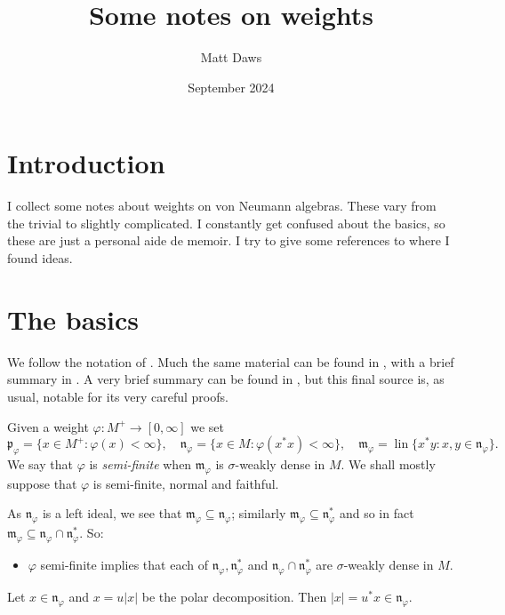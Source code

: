 \documentclass[a4paper,11pt]{article}
\theoremstyle{plain}
\theoremstyle{remark}
\newcommand{\mf}[1]{\mathfrak{#1}}
\newcommand{\lin}{\operatorname{lin}}
\begin{document}
\title{Some notes on weights}
\author{Matt Daws}
\date{September 2024}
\maketitle

\section{Introduction}

I collect some notes about weights on von Neumann algebras.  These vary from the trivial to slightly complicated.  I constantly get confused about the basics, so these are just a personal aide de memoir.  I try to give some references to where I found ideas.

\section{The basics}

We follow the notation of \cite[Chapter~VII]{TakesakiII}.  Much the same material can be found in \cite[Section~10.14]{StratilaZsido}, with a brief summary in \cite[Chapter~I]{Stratila_ModTheoryBook}.  A very brief summary can be found in \cite[Section~7.5]{KadisonRingroseII}, but this final source is, as usual, notable for its very careful proofs.

Given a weight $\varphi \colon M^+ \to [0,\infty]$ we set
\[ \mf p_\varphi = \{ x\in M^+ : \varphi(x)<\infty \}, \quad
\mf n_\varphi = \{ x\in M : \varphi(x^*x)<\infty \}, \quad
\mf m_\varphi = \lin \{ x^*y : x,y\in\mf n_\varphi \}. \]
We say that $\varphi$ is \emph{semi-finite} when $\mf m_\varphi$ is $\sigma$-weakly dense in $M$.  We shall mostly suppose that $\varphi$ is semi-finite, normal and faithful.

As $\mf n_\varphi$ is a left ideal, we see that $\mf m_\varphi \subseteq \mf n_\varphi$; similarly $\mf m_\varphi \subseteq \mf n_\varphi^*$ and so in fact $\mf m_\varphi \subseteq \mf n_\varphi \cap \mf n_\varphi^*$.  So:
\begin{itemize}
\item $\varphi$ semi-finite implies that each of $\mf n_\varphi, \mf n_\varphi^*$ and $\mf n_\varphi\cap\mf n_\varphi^*$ are $\sigma$-weakly dense in $M$.
\end{itemize}
Let $x\in\mf n_\varphi$ and $x=u|x|$ be the polar decomposition.  Then $|x| = u^*x\in\mf n_\varphi$.
\end{document}

